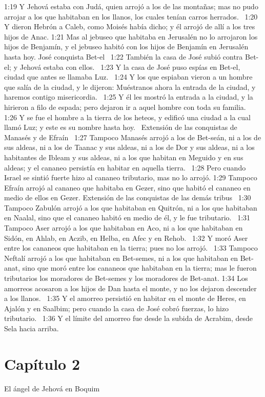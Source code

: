 1:19 Y Jehová estaba con Judá, quien arrojó a los de las montañas; mas no pudo arrojar a los que habitaban en los llanos, los cuales tenían carros herrados.  
1:20 Y dieron Hebrón a Caleb, como Moisés había dicho; y él arrojó de allí a los tres hijos de Anac. 
1:21 Mas al jebuseo que habitaba en Jerusalén no lo arrojaron los hijos de Benjamín, y el jebuseo habitó con los hijos de Benjamín en Jerusalén hasta hoy. 
José conquista Bet-el  
1:22 También la casa de José subió contra Bet-el; y Jehová estaba con ellos.  
1:23 Y la casa de José puso espías en Bet-el, ciudad que antes se llamaba Luz.  
1:24 Y los que espiaban vieron a un hombre que salía de la ciudad, y le dijeron: Muéstranos ahora la entrada de la ciudad, y haremos contigo misericordia.  
1:25 Y él les mostró la entrada a la ciudad, y la hirieron a filo de espada; pero dejaron ir a aquel hombre con toda su familia.  
1:26 Y se fue el hombre a la tierra de los heteos, y edificó una ciudad a la cual llamó Luz; y este es su nombre hasta hoy.  
Extensión de las conquistas de Manasés y de Efraín  
1:27 Tampoco Manasés arrojó a los de Bet-seán, ni a los de sus aldeas, ni a los de Taanac y sus aldeas, ni a los de Dor y sus aldeas, ni a los habitantes de Ibleam y sus aldeas, ni a los que habitan en Meguido y en sus aldeas; y el cananeo persistía en habitar en aquella tierra.  
1:28 Pero cuando Israel se sintió fuerte hizo al cananeo tributario, mas no lo arrojó. 
1:29 Tampoco Efraín arrojó al cananeo que habitaba en Gezer, sino que habitó el cananeo en medio de ellos en Gezer. 
Extensión de las conquistas de las demás tribus  
1:30 Tampoco Zabulón arrojó a los que habitaban en Quitrón, ni a los que habitaban en Naalal, sino que el cananeo habitó en medio de él, y le fue tributario.  
1:31 Tampoco Aser arrojó a los que habitaban en Aco, ni a los que habitaban en Sidón, en Ahlab, en Aczib, en Helba, en Afec y en Rehob.  
1:32 Y moró Aser entre los cananeos que habitaban en la tierra; pues no los arrojó.  
1:33 Tampoco Neftalí arrojó a los que habitaban en Bet-semes, ni a los que habitaban en Bet-anat, sino que moró entre los cananeos que habitaban en la tierra; mas le fueron tributarios los moradores de Bet-semes y los moradores de Bet-anat. 
1:34 Los amorreos acosaron a los hijos de Dan hasta el monte, y no los dejaron descender a los llanos.  
1:35 Y el amorreo persistió en habitar en el monte de Heres, en Ajalón y en Saalbim; pero cuando la casa de José cobró fuerzas, lo hizo tributario.  
1:36 Y el límite del amorreo fue desde la subida de Acrabim, desde Sela hacia arriba.  
\section*{Capítulo 2}
El ángel de Jehová en Boquim  

